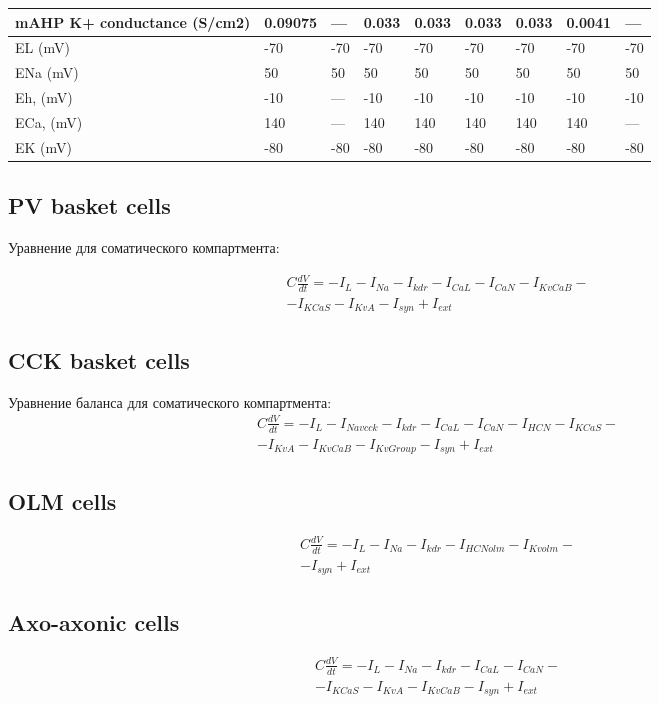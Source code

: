 \documentclass[12pt]{article}
\begin{document}
\begin{table}[h]
\begin{center}
\begin{tabular}{ |p{2cm} | p{1.25cm} |p{1.25cm} |p{1.25cm} |p{1.25cm} |p{1.25cm} |p{1.25cm} |p{1.25cm} |p{1.25cm} | }
mAHP  K+ conductance (S/cm2) & 0.09075 & --- & 0.033 & 0.033 & 0.033 & 0.033 & 0.0041 & --- \\ \hline  EL (mV) & -70 & -70 & -70 & -70 & -70 & -70 & -70 & -70 \\ \hline  ENa (mV) & 50 & 50 & 50 & 50 & 50 & 50 & 50 & 50 \\ \hline  Eh, (mV) & -10 & --- & -10 & -10 & -10 & -10 & -10 & -10 \\ \hline  ECa, (mV) & 140 & --- & 140 & 140 & 140 & 140 & 140 & --- \\ \hline  EK (mV) & -80 & -80 & -80 & -80 & -80 & -80 & -80 & -80 \\ \hline  
			
		\end{tabular}
	\end{center}
\end{table}

\subsection{PV basket cells}

Уравнение для соматического компартмента:

\begin{eqnarray}
C\frac{dV}{dt}=-I_L-I_{Na}-I_{kdr}-I_{CaL}-I_{CaN}-I_{KvCaB}- \nonumber \\ 
-I_{KCaS}-I_{KvA} -I_{syn} + I_{ext}
\end{eqnarray}


\subsection{CCK basket cells}
Уравнение баланса для соматического компартмента:
\begin{eqnarray}
C\frac{dV}{dt}=-I_L-I_{Navcck}-I_{kdr}-I_{CaL}-I_{CaN}-I_{HCN}-I_{KCaS}- \nonumber \\
-I_{KvA}-I_{KvCaB}-I_{KvGroup}-I_{syn} + I_{ext}
\end{eqnarray}


\subsection{OLM cells}
\begin{eqnarray}
C\frac{dV}{dt} = -I_L - I_{Na}- I_{kdr} - I_{HCNolm}-I_{Kvolm}-
 \nonumber \\
-I_{syn} + I_{ext}
\end{eqnarray}

\subsection{Axo-axonic cells}
\begin{eqnarray}
C\frac{dV}{dt}=-I_L-I_{Na}-I_{kdr}-I_{CaL}-I_{CaN}- \nonumber \\ 
-I_{KCaS}-I_{KvA}-I_{KvCaB}-I_{syn} + I_{ext}
\end{eqnarray}
\end{document}
